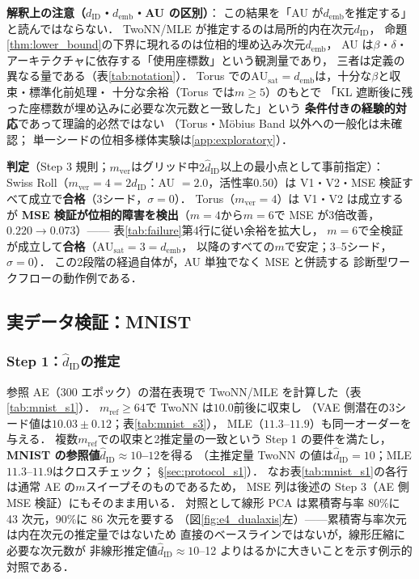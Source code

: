 \documentclass[11pt,a4paper]{jsarticle}
\newcommand{\dID}{d_{\mathrm{ID}}}
\newcommand{\hatdID}{\hat{d}_{\mathrm{ID}}}
\newcommand{\AUsat}{\mathrm{AU}_{\mathrm{sat}}}
\newcommand{\demb}{d_{\mathrm{emb}}}
\begin{document}
\textbf{解釈上の注意（$\dID$・$\demb$・AU の区別）}：
この結果を「AU が$\demb$を推定する」と読んではならない．
TwoNN/MLE が推定するのは局所的内在次元$\dID$，
命題\ref{thm:lower_bound}の下界に現れるのは位相的埋め込み次元$\demb$，
AU は$\beta$・$\delta$・アーキテクチャに依存する「使用座標数」という観測量であり，
三者は定義の異なる量である（表\ref{tab:notation}）．
Torus での$\AUsat = \demb$は，十分な$\beta$と収束・標準化前処理・
十分な余裕（Torus では$m \geq 5$）のもとで
「KL 遮断後に残った座標数が埋め込みに必要な次元数と一致した」という
\textbf{条件付きの経験的対応}であって理論的必然ではない
（Torus・M\"obius Band 以外への一般化は未確認；
単一シードの位相多様体実験は\ref{app:exploratory}）．

\textbf{判定}（Step 3 規則；$m_{\mathrm{ver}}$はグリッド中$2\hatdID$以上の最小点として事前指定）：
Swiss Roll（$m_{\mathrm{ver}} = 4 = 2\hatdID$：AU $= 2.0$，活性率$0.50$）は
V1・V2・MSE 検証すべて成立で\textbf{合格}（3シード，$\sigma = 0$）．
Torus（$m_{\mathrm{ver}} = 4$）は V1・V2 は成立するが
\textbf{MSE 検証が位相的障害を検出}（$m = 4$から$m = 6$で MSE が3倍改善，
$0.220 \to 0.073$）——
表\ref{tab:failure}第4行に従い余裕を拡大し，
$m = 6$で全検証が成立して\textbf{合格}（$\AUsat = 3 = \demb$，
以降のすべての$m$で安定；3--5シード，$\sigma = 0$）．
この2段階の経過自体が，AU 単独でなく MSE と併読する
診断型ワークフローの動作例である．

\subsection{実データ検証：MNIST}\label{sec:exp_mnist}

\subsubsection{Step 1：$\hatdID$の推定}

参照 AE（300 エポック）の潜在表現で TwoNN/MLE を計算した（表\ref{tab:mnist_s1}）．
$m_{\mathrm{ref}} \geq 64$で TwoNN は$10.0$前後に収束し
（VAE 側潜在の3シード値は$10.03 \pm 0.12$；表\ref{tab:mnist_s3}），
MLE（$11.3$--$11.9$）も同一オーダーを与える．
複数$m_{\mathrm{ref}}$での収束と2推定量の一致という Step 1 の要件を満たし，
\textbf{MNIST の参照値$\hatdID \approx 10$--$12$}を得る
（主推定量 TwoNN の値は$\hatdID = 10$；MLE $11.3$--$11.9$はクロスチェック；
§\ref{sec:protocol_s1}）．
なお表\ref{tab:mnist_s1}の各行は通常 AE の$m$スイープそのものであるため，
MSE 列は後述の Step 3（AE 側 MSE 検証）にもそのまま用いる．
対照として線形 PCA は累積寄与率 80\%に 43 次元，90\%に 86 次元を要する
（図\ref{fig:e4_dualaxis}左）——累積寄与率次元は内在次元の推定量ではないため
直接のベースラインではないが，線形圧縮に必要な次元数が
非線形推定値$\hatdID \approx 10$--12 よりはるかに大きいことを示す例示的対照である．
\end{document}
